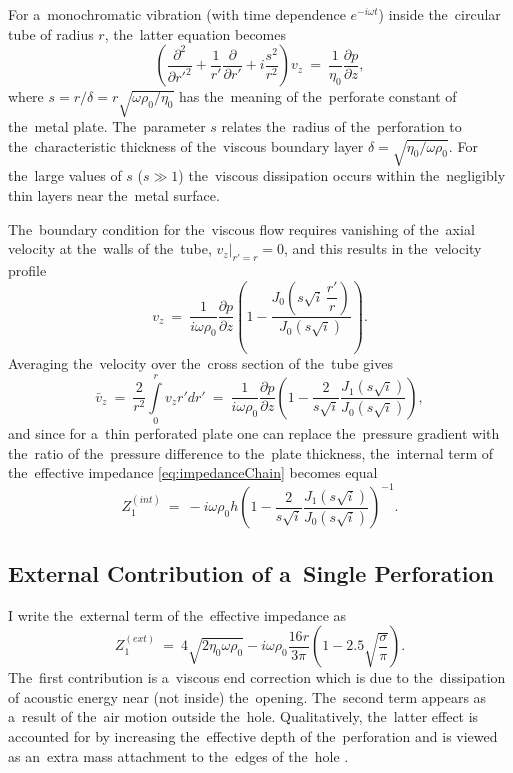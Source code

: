 For a~monochromatic vibration (with time dependence $e^{-i\omega t}$) inside the~circular tube of radius $r$, the~latter equation becomes
\begin{equation}
\left(\frac{\partial^2}{\partial r'^2}+\frac{1}{r'}\frac{\partial}{\partial r'}+i\frac{s^2}{r^2}\right)v_z~=~\frac{1}{\eta_0}\frac{\partial p}{\partial z},
\end{equation}
where $s=r/\delta=r\sqrt{\omega\rho_0/\eta_0}$ has the~meaning of the~perforate constant of the~metal plate.
The~parameter $s$ relates the~radius of the~perforation to the~characteristic thickness of the~viscous boundary layer $\delta=\sqrt{\eta_0/\omega\rho_0}$.
For the~large values of $s$ ($s \gg 1$) the~viscous dissipation occurs within the~negligibly thin layers near the~metal surface.

The~boundary condition for the~viscous flow requires vanishing of the~axial velocity at the~walls of the~tube, $\left.v_z\right|_{r'=r}=0$, and this results in the~velocity profile
\begin{equation}
v_z~=~\frac{1}{i\omega\rho_0}\frac{\partial p}{\partial z}\left(1-\frac{J_0\left(s\sqrt{i}\,\dfrac{r'}{r}\right)}{J_0\left(s\sqrt{i}\right)}\right).
\end{equation}
Averaging the~velocity over the~cross section of the~tube gives
\begin{equation}
\bar{v}_z~=~\frac{2}{r^2}\int\limits_{0}^{r}v_z r' dr'~=~\frac{1}{i\omega\rho_0}\frac{\partial p}{\partial z} \left(1-\frac{2}{s\sqrt{i}}\frac{J_1\left(s\sqrt{i}\right)}{J_0\left(s\sqrt{i}\right)}\right),
\end{equation}
and since for a~thin perforated plate one can replace the~pressure gradient with the~ratio of the~pressure difference to the~plate thickness, the~internal term of the~effective impedance \cref{eq:impedanceChain} becomes equal
\begin{equation}
Z_1^{(int)}~=~-i\omega\rho_0 h \left(1-\frac{2}{s\sqrt{i}}\frac{J_1\left(s\sqrt{i}\right)}{J_0\left(s\sqrt{i}\right)}\right)^{-1}.
\end{equation}


\subsection{External Contribution of a~Single Perforation}

I write the~external term of the~effective impedance as
\begin{equation}
Z_1^{(ext)}~=~4\sqrt{2\eta_0\omega\rho_0}-i\omega\rho_0\frac{16r}{3\pi}\left(1-2.5\sqrt{\frac{\sigma}{\pi}}\right).
\end{equation}
The~first contribution is a~viscous end correction \cite{guo} which is due to the~dissipation of acoustic energy near (not inside) the~opening.
The~second term appears as a~result of the~air motion outside the~hole.
Qualitatively, the~latter effect is accounted for by increasing the~effective depth of the~perforation and is viewed as an~extra mass attachment to the~edges of the~hole \cite{crandall,ingard}.

